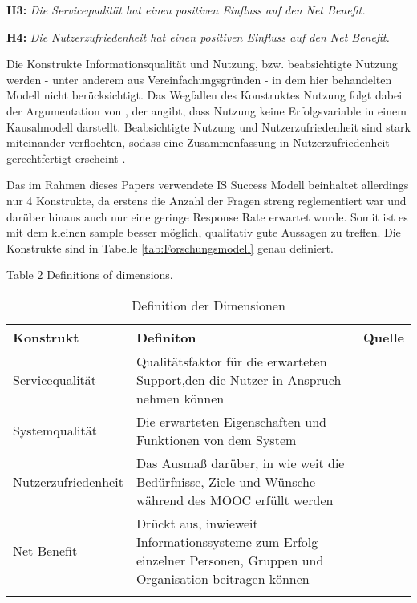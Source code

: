 \textbf{H3:} \textit{Die Servicequalität hat einen positiven Einfluss auf den Net Benefit.} 


\textbf{H4:} \textit{Die Nutzerzufriedenheit hat einen positiven Einfluss auf den Net Benefit.} \medskip


Die Konstrukte Informationsqualität und Nutzung, bzw. beabsichtigte Nutzung werden - unter anderem aus Vereinfachungsgründen - in dem hier behandelten Modell nicht berücksichtigt. Das Wegfallen des Konstruktes Nutzung folgt dabei der Argumentation von \textcite{seddon1997respecification}, der angibt, dass Nutzung keine Erfolgsvariable in einem Kausalmodell darstellt. Beabsichtigte Nutzung und Nutzerzufriedenheit sind stark miteinander verflochten, sodass eine Zusammenfassung in Nutzerzufriedenheit gerechtfertigt erscheint \parencite[vgl.][S.2970]{delone2002information}. 


Das im Rahmen dieses Papers verwendete IS Success Modell beinhaltet allerdings nur 4 Konstrukte, da erstens die Anzahl der Fragen streng reglementiert war und darüber hinaus auch nur eine geringe Response Rate erwartet wurde. Somit ist es mit dem kleinen sample besser möglich, qualitativ gute Aussagen zu treffen. Die Konstrukte sind in Tabelle \ref{tab:Forschungsmodell} genau definiert. 


Table 2
Definitions of dimensions.

\begin{table}[ht] 
\footnotesize
\caption{Definition der Dimensionen}
\label{tab:Dimensionen} 
\begin{tabular}{@{}lp{9cm}l@{}} \toprule

\textbf{Konstrukt} & \textbf{Definiton} & \textbf{Quelle} \\ \midrule


Servicequalität 	& Qualitätsfaktor für die erwarteten Support,den die Nutzer in Anspruch nehmen können & \parbox[t]{4cm}{\cite{petter2008measuring}}\\ 

Systemqualität 		& Die erwarteten Eigenschaften und Funktionen von dem System & \parbox[t]{4cm}{\cite{petter2008measuring}}\\ 

Nutzerzufriedenheit & Das Ausmaß darüber, in wie weit die Bedürfnisse, Ziele und Wünsche während des MOOC erfüllt werden & \parbox[t]{4cm}{\cite{sanchez2009moderating}}\\ 

Net Benefit 		& Drückt aus, inwieweit Informationssysteme zum Erfolg einzelner Personen, Gruppen und Organisation beitragen können  & \parbox[t]{4cm}{\cite{conf/gi/GemlikNSB10} \cite{Petter:0aa} }\\ \addlinespace 
  \bottomrule

\end{tabular}	
\end{table}



